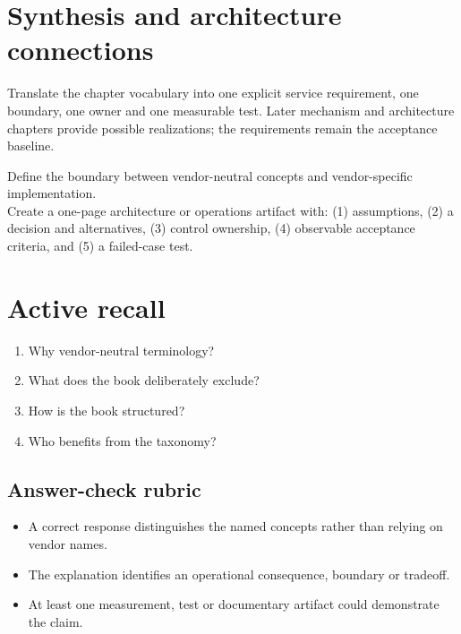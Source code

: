\documentclass[10pt,letterpaper]{article}
\begin{document}
\section{Synthesis and architecture connections}
Translate the chapter vocabulary into one explicit service requirement, one boundary, one owner and one measurable test. Later mechanism and architecture chapters provide possible realizations; the requirements remain the acceptance baseline.
\begin{workbox}[title={Applied deliverable}]
Define the boundary between vendor-neutral concepts and vendor-specific implementation.\\[4pt]Create a one-page architecture or operations artifact with: (1) assumptions, (2) a decision and alternatives, (3) control ownership, (4) observable acceptance criteria, and (5) a failed-case test.
\end{workbox}
\section{Active recall}
\begin{enumerate}
\item Why vendor-neutral terminology?
\item What does the book deliberately exclude?
\item How is the book structured?
\item Who benefits from the taxonomy?
\end{enumerate}
\subsection{Answer-check rubric}
\begin{itemize}
\item A correct response distinguishes the named concepts rather than relying on vendor names.
\item The explanation identifies an operational consequence, boundary or tradeoff.
\item At least one measurement, test or documentary artifact could demonstrate the claim.
\end{itemize}
\end{document}
